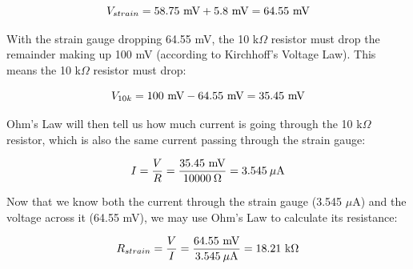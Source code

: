 $$V_{strain} = 58.75 \hbox{ mV} + 5.8 \hbox{ mV} = 64.55 \hbox{ mV}$$

With the strain gauge dropping 64.55 mV, the 10 k$\Omega$ resistor must drop the remainder making up 100 mV (according to Kirchhoff's Voltage Law).  This means the 10 k$\Omega$ resistor must drop:

$$V_{10k} = 100 \hbox{ mV} - 64.55 \hbox{ mV} = 35.45 \hbox{ mV}$$

Ohm's Law will then tell us how much current is going through the 10 k$\Omega$ resistor, which is also the same current passing through the strain gauge:

$$I = {V \over R} = {35.45 \hbox{ mV} \over 10000 \> \Omega} = 3.545 \> \mu\hbox{A}$$

Now that we know both the current through the strain gauge (3.545 $\mu$A) and the voltage across it (64.55 mV), we may use Ohm's Law to calculate its resistance:

$$R_{strain} = {V \over I} = {64.55 \hbox{ mV} \over 3.545 \> \mu\hbox{A}} = 18.21 \hbox{ k}\Omega$$



